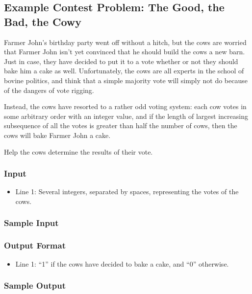 \subsection{Example Contest Problem: The Good, the Bad, the Cowy}
Farmer John's birthday party went off without a hitch, but the cows are worried that Farmer John isn't yet convinced that he should build the cows a new barn. Just in case, they have decided to put it to a vote whether or not they should bake him a cake as well.
Unfortunately, the cows are all experts in the school of bovine politics, and think that a simple majority vote will simply not do because of the dangers of vote rigging.

Instead, the cows have resorted to a rather odd voting system: each cow votes in some arbitrary order with an integer value, and if the length of largest increasing subsequence of all the votes is greater than half the number of cows, then the cows will bake Farmer John a cake.

Help the cows determine the results of their vote.

\subsubsection{Input}
\begin{itemize}
	\item Line 1: Several integers, separated by spaces, representing the votes of the cows.
\end{itemize}

\subsubsection{Sample Input}

\subsubsection{Output Format}
\begin{itemize}
	\item Line 1: ``1'' if the cows have decided to bake a cake, and ``0'' otherwise.
\end{itemize}
\subsubsection{Sample Output}

